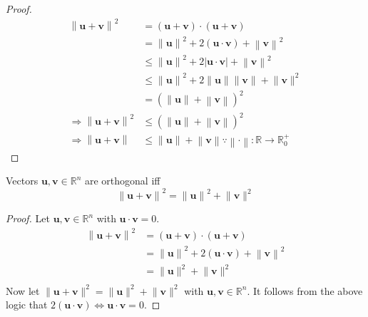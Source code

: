 \begin{proof}
    \begin{align*}
        \left\lVert \mathbf{u} +\mathbf{v}  \right\rVert^2 &= \left( \mathbf{u} +\mathbf{v}  \right) \cdot \left( \mathbf{u} +\mathbf{v}  \right) \\
        &=\left\lVert \mathbf{u}  \right\rVert ^2 +2(\mathbf{u} \cdot \mathbf{v} )+\left\lVert \mathbf{v}  \right\rVert^2\\
        &\leq \left\lVert \mathbf{u}  \right\rVert^2 +2\left\vert \mathbf{u} \cdot \mathbf{v}  \right\vert +\left\lVert \mathbf{v}  \right\rVert^2\\
        &\leq \left\lVert \mathbf{u}  \right\rVert ^2 +2\lVert \mathbf{u}  \rVert \lVert \mathbf{v}  \rVert +\lVert \mathbf{v}  \rVert^2\\
        &= \left( \left\lVert \mathbf{u}  \right\rVert+\left\lVert \mathbf{v}  \right\rVert   \right)^2\\
        \Longrightarrow \left\lVert \mathbf{u} +\mathbf{v}  \right\rVert ^2 &\leq \left( \left\lVert \mathbf{u}  \right\rVert+\left\lVert \mathbf{v}  \right\rVert   \right)^2\\
        \Longrightarrow \left\lVert \mathbf{u} +\mathbf{v}  \right\rVert &\leq \left\lVert \mathbf{u}  \right\rVert +\left\lVert \mathbf{v}  \right\rVert \because \left\lVert \cdot \right\rVert :\mathbb{R} \to \mathbb{R} ^+_0
\end{align*}
\end{proof}
\begin{theorem}
    Vectors \(\mathbf{u} ,\mathbf{v} \in\mathbb{R} ^n\) are orthogonal iff 
    \[
        \left\lVert \mathbf{u} +\mathbf{v}  \right\rVert^2 = \left\lVert \mathbf{u}  \right\rVert^2 +\lVert \mathbf{v}  \rVert^2 
    \]
\end{theorem}
\begin{proof}
    Let \(\mathbf{u} ,\mathbf{v} \in\mathbb{R} ^n\) with \(\mathbf{u} \cdot \mathbf{v} =0\).
    \begin{align*}
        \left\lVert \mathbf{u} +\mathbf{v}  \right\rVert^2 &= \left( \mathbf{u} +\mathbf{v}  \right) \cdot \left( \mathbf{u} +\mathbf{v}  \right) \\
        &= \left\lVert \mathbf{u}  \right\rVert^2 + 2\left( \mathbf{u} \cdot \mathbf{v}  \right) +\left\lVert \mathbf{v}  \right\rVert^2\\
        &= \lVert \mathbf{u}  \rVert^2 +\lVert \mathbf{v}  \rVert^2\\
    \end{align*}
    Now let \(\lVert \mathbf{u} +\mathbf{v}  \rVert^2 = \lVert \mathbf{u}  \rVert^2 +\lVert \mathbf{v}  \rVert^2   \) with \(\mathbf{u} ,\mathbf{v} \in\mathbb{R} ^n\). It follows from the above logic that \(2(\mathbf{u} \cdot \mathbf{v}) \iff \mathbf{u} \cdot \mathbf{v} =0\).
\end{proof}
